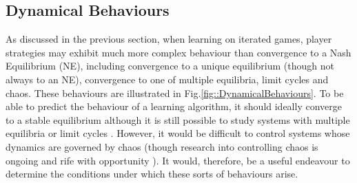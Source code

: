 \documentclass[sigconf]{aamas}
\begin{document}
\subsection{Dynamical Behaviours}
\label{sec::DynamicalBehaviours}

    As discussed in the previous section, when learning on iterated games, player
    strategies may exhibit much more complex behaviour than
    convergence to a Nash Equilibrium (NE),
    including convergence to a unique
    equilibrium (though not always to an NE), convergence to one of
    multiple equilibria, limit cycles and chaos. These behaviours are
    illustrated in Fig.\ref{fig::DynamicalBehaviours}. To be able to predict the behaviour of a learning algorithm, it should ideally converge to a stable equilibrium
    although it is still possible to study systems with multiple
    equilibria or limit cycles \cite{Strogatz2000}. However, it would
    be difficult to control systems whose dynamics are governed by
    chaos (though research into controlling chaos is ongoing and rife
    with opportunity \cite{Fradkov2009}). It would, therefore, be a useful endeavour to
    determine the conditions under which these sorts of behaviours
    arise.
\end{document}
